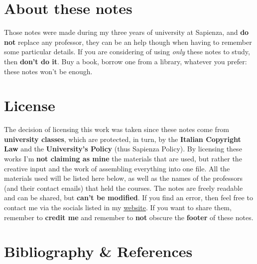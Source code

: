 \section*{About these notes}

Those notes were made during my three years of university at Sapienza, and \textbf{do not} replace any professor, they can be an help though when having to remember some particular details. If you are considering of using \textit{only} these notes to study, then \textbf{don't do it}. Buy a book, borrow one from a library, whatever you prefer: these notes won't be enough.

\section*{License}

The decision of licensing this work was taken since these notes come from \textbf{university classes}, which are protected, in turn, by the \textbf{Italian Copyright Law} and the \textbf{University's Policy} (thus Sapienza Policy). By licensing these works I'm \textbf{not claiming as mine} the materials that are used, but rather the creative input and the work of assembling everything into one file.
\nl
All the materials used will be listed here below, as well as the names of the professors (and their contact emails) that held the courses.
\nl
The notes are freely readable and can be shared, but \textbf{can't be modified}. If you find an error, then feel free to contact me via the socials listed in my \href{https://www.leonardobiason.com}{website}. If you want to share them, remember to \textbf{credit me} and remember to \textbf{not} obscure the \textbf{footer} of these notes.

\section*{Bibliography \texorpdfstring{\&}{&} References}

\begingroup
    \patchcmd{\thebibliography}{\chapter*}{\section*}{}{}
    \renewcommand{\section}[2]{}%
    

